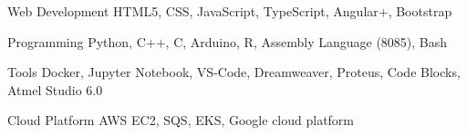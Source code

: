 \vspace{-9mm}


\begin{cvskills}


\cvskill
{Web Development} %
{HTML5, CSS, JavaScript, TypeScript, Angular+, Bootstrap } %


\cvskill
{Programming} %
{Python, C++, C, Arduino, R, Assembly Language (8085), Bash} %



\cvskill
{Tools} %
{Docker, Jupyter Notebook, VS-Code, Dreamweaver, Proteus, Code Blocks, Atmel Studio 6.0} %


\cvskill
{Cloud Platform} %
{AWS EC2, SQS, EKS, Google cloud platform} %


\end{cvskills}